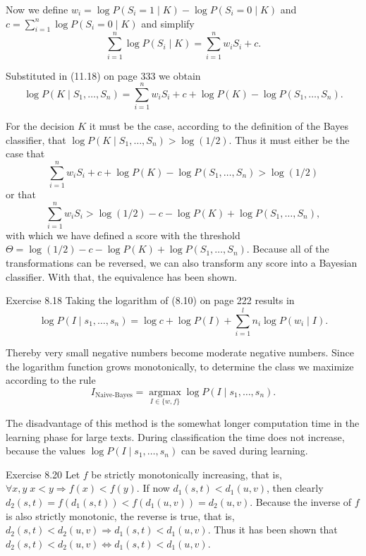 \documentclass[10pt]{book}
\begin{document}
\begin{center}
Now we define $w_{i}=\log P\left(S_{i}=1 \mid K\right)-\log P\left(S_{i}=0 \mid K\right)$ and $c=\sum_{i=1}^{n} \log P\left(S_{i}=0 \mid K\right)$ and simplify
$$
\sum_{i=1}^{n} \log P\left(S_{i} \mid K\right)=\sum_{i=1}^{n} w_{i} S_{i}+c.
$$

Substituted in (11.18) on page 333 we obtain
$$
\log P\left(K \mid S_{1}, \ldots, S_{n}\right)=\sum_{i=1}^{n} w_{i} S_{i}+c+\log P(K)-\log P\left(S_{1}, \ldots, S_{n}\right).
$$

For the decision $K$ it must be the case, according to the definition of the Bayes classifier, that $\log P\left(K \mid S_{1}, \ldots, S_{n}\right)>\log (1 / 2)$. Thus it must either be the case that
$$
\sum_{i=1}^{n} w_{i} S_{i}+c+\log P(K)-\log P\left(S_{1}, \ldots, S_{n}\right)>\log (1 / 2)
$$
or that
$$
\sum_{i=1}^{n} w_{i} S_{i}>\log (1 / 2)-c-\log P(K)+\log P\left(S_{1}, \ldots, S_{n}\right),
$$
with which we have defined a score with the threshold $\Theta=\log (1 / 2)-c-\log P(K)+\log P\left(S_{1}, \ldots, S_{n}\right)$. Because all of the transformations can be reversed, we can also transform any score into a Bayesian classifier. With that, the equivalence has been shown.

Exercise 8.18 Taking the logarithm of (8.10) on page 222 results in
$$
\log P\left(I \mid s_{1}, \ldots, s_{n}\right)=\log c+\log P(I)+\sum_{i=1}^{l} n_{i} \log P\left(w_{i} \mid I\right).
$$

Thereby very small negative numbers become moderate negative numbers. Since the logarithm function grows monotonically, to determine the class we maximize according to the rule
$$
I_{\text{Naive-Bayes}}=\underset{I \in\{w, f\}}{\operatorname{argmax}} \log P\left(I \mid s_{1}, \ldots, s_{n}\right).
$$

The disadvantage of this method is the somewhat longer computation time in the learning phase for large texts. During classification the time does not increase, because the values $\log P\left(I \mid s_{1}, \ldots, s_{n}\right)$ can be saved during learning.

Exercise 8.20 Let $f$ be strictly monotonically increasing, that is, $\forall x, y \; x<y \Rightarrow f(x)<f(y)$. If now $d_{1}(s, t)<d_{1}(u, v)$, then clearly $d_{2}(s, t)=f\left(d_{1}(s, t)\right)<f\left(d_{1}(u, v)\right)=d_{2}(u, v)$. Because the inverse of $f$ is also strictly monotonic, the reverse is true, that is, $d_{2}(s, t)<d_{2}(u, v) \Rightarrow d_{1}(s, t)<d_{1}(u, v)$. Thus it has been shown that $d_{2}(s, t)<d_{2}(u, v) \Leftrightarrow d_{1}(s, t)<d_{1}(u, v)$.


\end{center}
\end{document}
